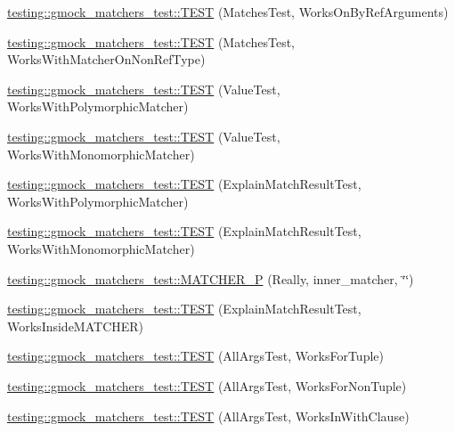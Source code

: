 \begin{DoxyCompactItemize}
\item 
\hyperlink{namespacetesting_1_1gmock__matchers__test_a6cfa391c9035262ccdc0d8f59e037b4d}{testing\+::gmock\+\_\+matchers\+\_\+test\+::\+T\+E\+ST} (Matches\+Test, Works\+On\+By\+Ref\+Arguments)
\item 
\hyperlink{namespacetesting_1_1gmock__matchers__test_a9fd734ae5afb64a7285503bc0870c255}{testing\+::gmock\+\_\+matchers\+\_\+test\+::\+T\+E\+ST} (Matches\+Test, Works\+With\+Matcher\+On\+Non\+Ref\+Type)
\item 
\hyperlink{namespacetesting_1_1gmock__matchers__test_a150118d4e990ba9fb9978329e742c931}{testing\+::gmock\+\_\+matchers\+\_\+test\+::\+T\+E\+ST} (Value\+Test, Works\+With\+Polymorphic\+Matcher)
\item 
\hyperlink{namespacetesting_1_1gmock__matchers__test_a53403682e9ffc12152b0b1c7f55dfa12}{testing\+::gmock\+\_\+matchers\+\_\+test\+::\+T\+E\+ST} (Value\+Test, Works\+With\+Monomorphic\+Matcher)
\item 
\hyperlink{namespacetesting_1_1gmock__matchers__test_a985e2bc1546b67de764d759de111e8e9}{testing\+::gmock\+\_\+matchers\+\_\+test\+::\+T\+E\+ST} (Explain\+Match\+Result\+Test, Works\+With\+Polymorphic\+Matcher)
\item 
\hyperlink{namespacetesting_1_1gmock__matchers__test_aeff2711a03b27a66c1c98ed97ff49b09}{testing\+::gmock\+\_\+matchers\+\_\+test\+::\+T\+E\+ST} (Explain\+Match\+Result\+Test, Works\+With\+Monomorphic\+Matcher)
\item 
\hyperlink{namespacetesting_1_1gmock__matchers__test_ab4f04d3b75ca92e4f5fd711b9f2a514a}{testing\+::gmock\+\_\+matchers\+\_\+test\+::\+M\+A\+T\+C\+H\+E\+R\+\_\+P} (Really, inner\+\_\+matcher, \char`\"{}\char`\"{})
\item 
\hyperlink{namespacetesting_1_1gmock__matchers__test_ae57edef8890da6b929dd0d21c2f7c071}{testing\+::gmock\+\_\+matchers\+\_\+test\+::\+T\+E\+ST} (Explain\+Match\+Result\+Test, Works\+Inside\+M\+A\+T\+C\+H\+ER)
\item 
\hyperlink{namespacetesting_1_1gmock__matchers__test_aeea300647af4c7611f4e491cabcbf950}{testing\+::gmock\+\_\+matchers\+\_\+test\+::\+T\+E\+ST} (All\+Args\+Test, Works\+For\+Tuple)
\item 
\hyperlink{namespacetesting_1_1gmock__matchers__test_aacc3ed6d6a0f9ff552019d0d58817b6f}{testing\+::gmock\+\_\+matchers\+\_\+test\+::\+T\+E\+ST} (All\+Args\+Test, Works\+For\+Non\+Tuple)
\item 
\hyperlink{namespacetesting_1_1gmock__matchers__test_ad62534535946b2ef45457fb653f73a98}{testing\+::gmock\+\_\+matchers\+\_\+test\+::\+T\+E\+ST} (All\+Args\+Test, Works\+In\+With\+Clause)

\end{DoxyCompactItemize}
